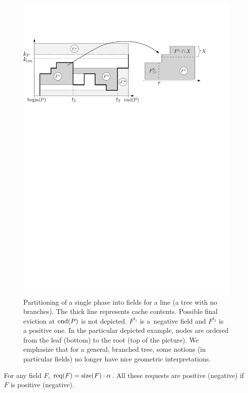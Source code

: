 \begin{figure}[t]
  \centering
  \includegraphics[width=0.99\columnwidth,keepaspectratio]{figs/cache-management/fields_horizontal}
  \caption{Partitioning of a single phase into fields for a line (a tree with
  no branches). The thick line represents cache contents. Possible final eviction
  at $\textrm{end}(P)$ is not depicted. $F^{t_1}$ is a~negative field and $F^{t_2}$ is a
  positive one. In the particular depicted example, nodes are ordered from the
  leaf (bottom) to the root (top  of the picture). We emphasize that for a
  general, branched tree, some notions (in particular fields) no longer have
  nice geometric interpretations.}
  \label{fig:fields}
\end{figure}


\begin{observation}
\label{obs:field_requests}
For any field $F$, $\textrm{req}(F) = \textrm{size}(F) \cdot \alpha$. All these requests are
positive (negative) if $F$ is positive (negative).
\end{observation}

